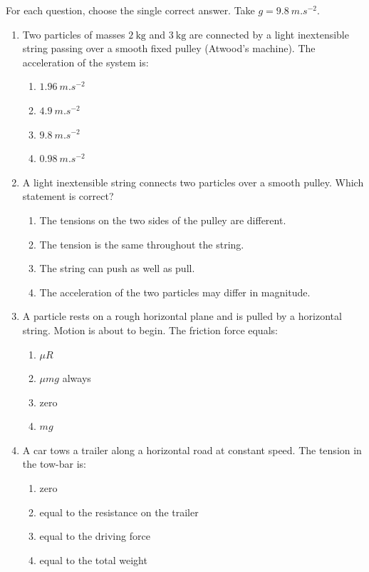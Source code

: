 \documentclass[11pt]{article}
\begin{document}
\begin{exercice}
For each question, choose the single correct answer. Take $g = \SI{9.8}{m.s^{-2}}$.
\begin{enumerate}
\item Two particles of masses $2\ \mathrm{kg}$ and $3\ \mathrm{kg}$ are connected by a light inextensible string passing over a smooth fixed pulley (Atwood's machine). The acceleration of the system is:
\begin{enumerate}
\item $\SI{1.96}{m.s^{-2}}$ \quad \item $\SI{4.9}{m.s^{-2}}$ \quad \item $\SI{9.8}{m.s^{-2}}$ \quad \item $\SI{0.98}{m.s^{-2}}$
\end{enumerate}
\item A light inextensible string connects two particles over a smooth pulley. Which statement is correct?
\begin{enumerate}
\item The tensions on the two sides of the pulley are different.
\item The tension is the same throughout the string.
\item The string can push as well as pull.
\item The acceleration of the two particles may differ in magnitude.
\end{enumerate}
\item A particle rests on a rough horizontal plane and is pulled by a horizontal string. Motion is about to begin. The friction force equals:
\begin{enumerate}
\item $\mu R$ \quad \item $\mu mg$ always \quad \item zero \quad \item $mg$
\end{enumerate}
\item A car tows a trailer along a horizontal road at constant speed. The tension in the tow-bar is:
\begin{enumerate}
\item zero \quad \item equal to the resistance on the trailer \quad \item equal to the driving force \quad \item equal to the total weight
\end{enumerate}
\end{enumerate}
\end{exercice}
\end{document}
